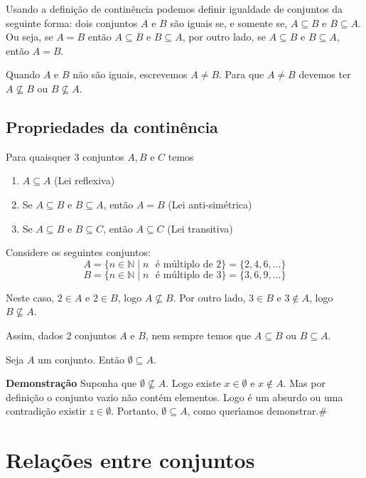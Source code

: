 Usando a definição de continência podemos definir igualdade de conjuntos da seguinte forma: dois conjuntos $A$ e $B$ são iguais se, e somente se, $A \subseteq B$ e $B \subseteq A$. Ou seja, se $A = B$ ent{\~a}o $A \subseteq B$ e $B \subseteq A$, por outro lado, se $A \subseteq B$ e $B \subseteq A$, ent{\~a}o $A = B$.

Quando $A$ e $B$ n{\~a}o s{\~a}o iguais, escrevemos $A \neq B$. Para que $A \neq B$ devemos ter $A \nsubseteq B$ ou $B \nsubseteq A$.

\subsection{Propriedades da contin{\^e}ncia}
Para quaisquer 3 conjuntos $A,B$ e $C$ temos
\begin{enumerate}
\item $A\subseteq A$ (Lei reflexiva)
\item Se $A\subseteq B \mbox{ e } B\subseteq A$, ent{\~a}o $A=B$ (Lei anti-sim{\'e}trica)
\item Se $A\subseteq B$ e $B\subseteq C$, ent{\~a}o $A\subseteq C$ (Lei transitiva)
\end{enumerate}

Considere os seguintes conjuntos:
\[A = \{ n \in \mathbb{N} \mid n \mbox{ {\'e} m{\'u}ltiplo de } 2\}=\{2,4,6,...\}\]
\[ B = \{n\in\mathbb{N} \mid n \mbox{ {\'e} m{\'u}ltiplo de } 3\}=\{3,6,9,...\}\]

Neste caso, $2 \in A$ e $2 \in B$, logo $A \nsubseteq B$. Por outro lado, $3 \in B$ e $3 \notin A$, logo $B \nsubseteq A$.

Assim, dados 2 conjuntos $A$ e $B$, nem sempre temos que $A \subseteq B$ ou $B \subseteq A$.

\begin{proposicao} Seja $A$ um conjunto. Ent{\~a}o $ \emptyset \subseteq A$.\end{proposicao}

\textbf{Demonstra{\c c}{\~a}o} Suponha que $ \emptyset \nsubseteq A$. Logo existe $x \in \emptyset$ e $x \notin A$. Mas por defini{\c c}{\~a}o o conjunto vazio n{\~a}o cont{\'e}m elementos. Logo {\'e} um absurdo ou uma contradi{\c c}{\~a}o existir $z \in \emptyset$. Portanto, $ \emptyset \subseteq A$, como quer{\'\i}amos demonstrar.\#

\section{Rela{\c c}{\~o}es entre conjuntos}

